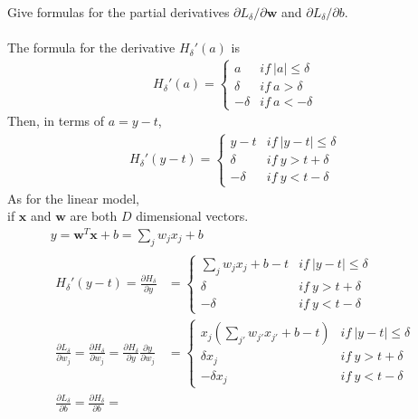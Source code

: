 \documentclass{myhw}
\begin{document}
\begin{homeworkProblem}
\begin{homeworkSection}
Give formulas for the partial derivatives $\partial L_\delta / \partial \textbf{w}$ and $\partial L_\delta / \partial b$. \\
\\
The formula for the derivative $H_\delta '(a)$ is
\begin{gather*}
H_\delta'(a) = 
	\left\{ 
	\begin{array}{lr} 
	a & if\ |a| \le \delta \\ 
	\delta & if\ a > \delta \\
	- \delta & if\ a < -\delta
	\end{array} \right.
\end{gather*}
Then, in terms of $a=y-t$, 
\begin{gather*}
H_\delta'(y-t) = 
	\left\{ 
	\begin{array}{lr} 
	y-t & if\ |y-t| \le \delta \\ 
	\delta & if\ y > t + \delta \\
	- \delta & if\ y < t - \delta
	\end{array} \right.
\end{gather*}
As for the linear model, \\if $\textbf{x}$ and $\textbf{w}$ are both $D$ dimensional vectors. 
\begin{gather*}
y = \textbf{w}^T\textbf{x} + b = \sum_j{w_j x_j + b} \\
\begin{aligned}
H_\delta'(y-t) = \frac{\partial H_\delta}{\partial y} & = 
	\left\{ 
	\begin{array}{lr} 
	\sum_j{w_j x_j + b} - t & if\ |y-t| \le \delta \\ 
	\delta & if\ y > t + \delta \\
	- \delta & if\ y < t - \delta
	\end{array} \right.
\\
\frac{\partial L_\delta}{\partial w_j} = \frac{\partial H_\delta}{\partial w_j} = 
\frac{\partial H_\delta}{\partial y} \frac{\partial y}{\partial w_j} & = 
	\left\{ 
	\begin{array}{lr} 
	x_j (\sum_{j'}{w_{j'} x_{j'} + b} - t) & if\ |y-t| \le \delta \\ 
	\delta x_j & if\ y > t + \delta \\
	- \delta x_j & if\ y < t - \delta
	\end{array} \right.
\\
\frac{\partial L_\delta}{\partial b} = \frac{\partial H_\delta}{\partial b} =

\end{aligned}
\end{gather*}
\end{homeworkSection}
\end{homeworkProblem}
\end{document}
